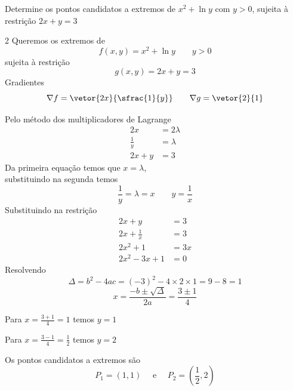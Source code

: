 \documentclass[a4paper,12pt,fleqn]{article}
\begin{document}

Determine os pontos candidatos a extremos de
\(
    x^2 + \ln y
\)
com $y>0$, sujeita à restrição
\(
    2x + y = 3
\)
\clearpagequestiononly

\begin{answer}
\begin{multicols}{2}
Queremos os extremos de
\[
    f(x, y) = x^2+\ln y \qquad y > 0
\]
sujeita à restrição
\[
    g(x, y) = 2x + y = 3
\]
Gradientes
\[
    \nabla f = \vetor{2x}{\sfrac{1}{y}}
    \qquad
    \nabla g = \vetor{2}{1}
\]

Pelo método dos multiplicadores de Lagrange
\begin{align*}
    2x          & = 2\lambda \\
    \frac{1}{y} & = \lambda \\
    2x + y      & = 3
\end{align*}
Da primeira equação temos que \(x=\lambda\), \\
substituindo na segunda temos
\[
    \frac{1}{y} = \lambda = x
    \qquad
    y = \frac{1}{x}
\]
Substituindo na restrição
\begin{align*}
    2x + y           & = 3  \\
    2x + \frac{1}{x} & = 3  \\
    2x^2 + 1         & = 3x \\
    2x^2 - 3x + 1    & = 0
\end{align*}
Resolvendo
\[
    \Delta
    = b^2 - 4ac
    = (-3)^2 - 4 \times 2 \times 1
    = 9 - 8
    = 1
\]
\[
    x
    = \frac{-b\pm\sqrt{\Delta}}{2a}
    = \frac{3\pm 1}{4}
\]

\smallskip
Para \(x=\frac{3+1}{4}=1\) temos \(y=1\)

\smallskip
Para \(x=\frac{3-1}{4}=\frac{1}{2}\) temos \(y=2\)

\smallskip
Os pontos candidatos a extremos são
\[
  P_1 = \left(1, 1\right)
  \quad \text{ e } \quad
  P_2 = \left(\frac{1}{2}, 2\right)
\]
\end{multicols}
\end{answer}
\end{document}
